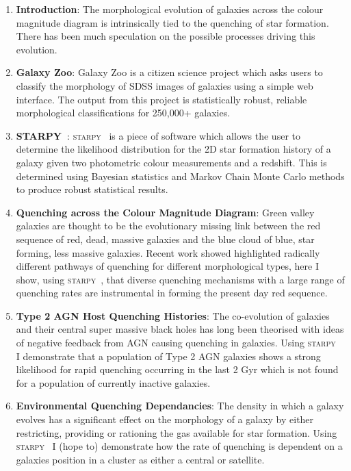 \documentclass[useAMS,usenatbib]{mn2e}
\def\starpy {\textsc{starpy}}
\begin{document}
\begin{enumerate}[I]
\item{{\bf Introduction}: The morphological evolution of galaxies across the colour magnitude diagram is intrinsically tied to the quenching of star formation. There has been much speculation on the possible processes driving this evolution.}

\item{{\bf Galaxy Zoo}: Galaxy Zoo is a citizen science project which asks users to classify the morphology of SDSS images of galaxies using a simple web interface. The output from this project is statistically robust, reliable morphological classifications for 250,000+ galaxies.}

\item{{\bf STARPY~}: \starpy~ is a piece of software which allows the user to determine the likelihood distribution for the 2D star formation history of a galaxy given two photometric colour measurements and a redshift. This is determined using Bayesian statistics and Markov Chain Monte Carlo methods to produce robust statistical results.}

\item{{\bf Quenching across the Colour Magnitude Diagram}: Green valley galaxies are thought to be the evolutionary missing link between the red sequence of red, dead, massive galaxies and the blue cloud of blue, star forming, less massive galaxies. Recent work showed highlighted radically different pathways of quenching for different morphological types, here I show, using \starpy~, that diverse quenching mechanisms with a large range of quenching rates are instrumental in forming the present day red sequence.}

\item{{\bf Type 2 AGN Host Quenching Histories}: The co-evolution of galaxies and their central super massive black holes has long been theorised with ideas of negative feedback from AGN causing quenching in galaxies. Using \starpy~ I demonstrate that a population of Type 2 AGN galaxies shows a strong likelihood for rapid quenching occurring in the last 2 Gyr which is not found for a population of currently inactive galaxies.}

\item{{\bf Environmental Quenching Dependancies}: The density in which a galaxy evolves has a significant effect on the morphology of a galaxy by either restricting, providing or rationing the gas available for star formation. Using \starpy~ I (hope to) demonstrate how the rate of quenching is dependent on a galaxies position in a cluster as either a central or satellite.}


\end{enumerate}
\end{document}
